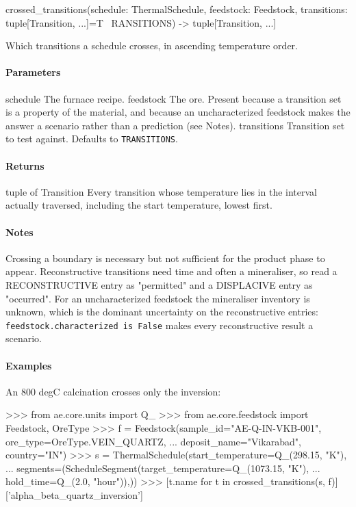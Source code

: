 \documentclass[10pt,a4paper,twoside]{report}
\begin{document}
\begin{verbatimsmall}
crossed_transitions(schedule: ThermalSchedule, feedstock: Feedstock, transitions: tuple[Transition, ...]=T
    \ RANSITIONS) -> tuple[Transition, ...]
\end{verbatimsmall}

Which transitions a schedule crosses, in ascending temperature order.

\paragraph*{Parameters}

schedule The furnace recipe. feedstock The ore. Present because a transition set is a property of the material, and because an uncharacterized feedstock makes the answer a scenario rather than a prediction (see Notes). transitions Transition set to test against. Defaults to \texttt{TRANSITIONS}.

\paragraph*{Returns}

tuple of Transition Every transition whose temperature lies in the interval actually traversed, including the start temperature, lowest first.

\paragraph*{Notes}

Crossing a boundary is necessary but not sufficient for the product phase to appear. Reconstructive transitions need time and often a mineraliser, so read a RECONSTRUCTIVE entry as "permitted" and a DISPLACIVE entry as "occurred". For an uncharacterized feedstock the mineraliser inventory is unknown, which is the dominant uncertainty on the reconstructive entries: \texttt{feedstock.characterized is False} makes every reconstructive result a scenario.

\paragraph*{Examples}

An 800 degC calcination crosses only the inversion:

\begin{doctestblock}
>>> from ae.core.units import Q_
>>> from ae.core.feedstock import Feedstock, OreType
>>> f = Feedstock(sample_id="AE-Q-IN-VKB-001", ore_type=OreType.VEIN_QUARTZ,
...               deposit_name="Vikarabad", country="IN")
>>> s = ThermalSchedule(start_temperature=Q_(298.15, "K"),
...                     segments=(ScheduleSegment(target_temperature=Q_(1073.15, "K"),
...                                               hold_time=Q_(2.0, "hour")),))
>>> [t.name for t in crossed_transitions(s, f)]
['alpha_beta_quartz_inversion']
\end{doctestblock}
\end{document}

